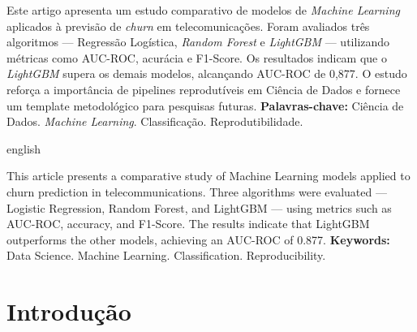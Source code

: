 \documentclass[
    article,
    12pt,
    oneside,
    a4paper,
    english,
    brazilian
    ]{abntex2}
\numberwithin{equation}{section}
\begin{document}
\pretextual
\maketitle
\newpage

\begin{resumo}
\noindent Este artigo apresenta um estudo comparativo de modelos de \textit{Machine Learning} aplicados à previsão de \textit{churn} em telecomunicações. Foram avaliados três algoritmos --- Regressão Logística, \textit{Random Forest} e \textit{LightGBM} --- utilizando métricas como AUC-ROC, acurácia e F1-Score. Os resultados indicam que o \textit{LightGBM} supera os demais modelos, alcançando AUC-ROC de 0,877. O estudo reforça a importância de pipelines reprodutíveis em Ciência de Dados e fornece um template metodológico para pesquisas futuras.
\newline
\noindent \textbf{Palavras-chave:} Ciência de Dados. \textit{Machine Learning}. Classificação. Reprodutibilidade.
\end{resumo}

\begin{otherlanguage*}{english}
\begin{resumo}[Abstract]
\noindent This article presents a comparative study of Machine Learning models applied to churn prediction in telecommunications. Three algorithms were evaluated --- Logistic Regression, Random Forest, and LightGBM --- using metrics such as AUC-ROC, accuracy, and F1-Score. The results indicate that LightGBM outperforms the other models, achieving an AUC-ROC of 0.877.
\newline
\noindent \textbf{Keywords:} Data Science. Machine Learning. Classification. Reproducibility.
\end{resumo}
\end{otherlanguage*}
\newpage

\textual

\section{Introdução}
\end{document}
